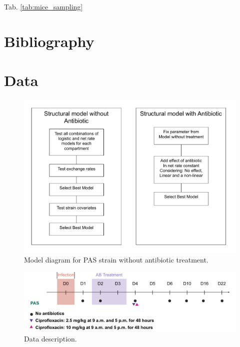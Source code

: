 \documentclass{article}
\begin{document}
Tab. \ref{tab:mice_sampling}

\section{Bibliography}
\printbibliography %

\appendix
\section{Data}


\begin{figure}
	\centering
	\includegraphics[width=0.8\linewidth]{images/anoruti_model_strategy_v002.pdf}
	\caption{Model diagram for PAS strain without antibiotic treatment. }
	\label{fig:ModelingStrategy}
\end{figure}


\begin{figure}
	\centering
	\includegraphics[width=0.8\linewidth]{images/draw_Anoruti_flowchart_PAS.pdf}
	\caption{Data description. }
\end{figure}
\end{document}
